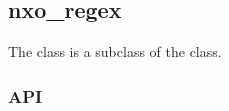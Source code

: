 %
%
%
%
%

\subsection{nxo\_regex}
\label{nxo_regex}

The  class is a subclass of the  class.

\subsubsection{API}
